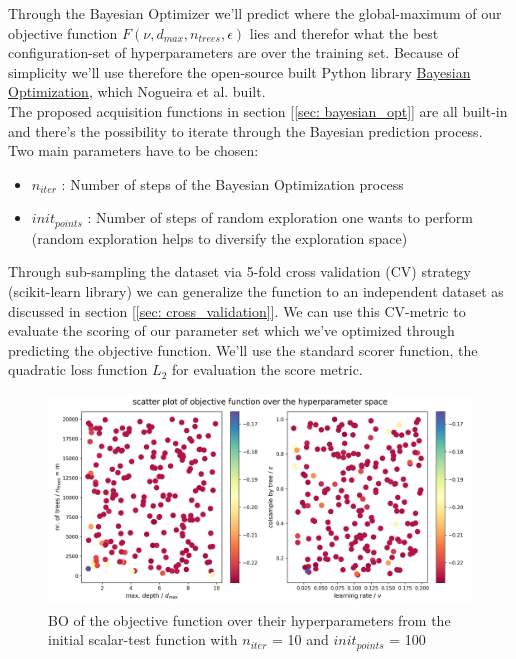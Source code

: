 \documentclass[12pt, a4paper]{article}
\begin{document}
Through the Bayesian Optimizer we'll predict where the global-maximum of our objective function $F(\nu,d_{max},n_{trees},\epsilon)$ lies and therefor what the best configuration-set of hyperparameters are over the training set. Because of simplicity we'll use therefore the open-source built Python library \href{https://github.com/bayesian-optimization/BayesianOptimization}{Bayesian Optimization}, which Nogueira et al. \cite{Nogueira2014} built. \\
The proposed acquisition functions in section [\ref{sec: bayesian_opt}] are all built-in and there's the possibility to iterate through the Bayesian prediction process. Two main parameters have to be chosen:
\begin{itemize}
    \item $n_{iter}$ : Number of steps of the Bayesian Optimization process
    \item $init_{points}$ : Number of steps of random exploration one wants to perform (random exploration helps to diversify the exploration space)
\end{itemize}
Through sub-sampling the dataset via 5-fold cross validation (CV) strategy (scikit-learn library) we can generalize the function to an independent dataset as discussed in section [\ref{sec: cross_validation}]. We can use this CV-metric to evaluate the scoring of our parameter set which we've optimized through predicting the objective function. We'll use the standard scorer function, the quadratic loss function $L_2$ for evaluation the score metric.
\begin{figure}[!htpb]
    \centering
    \includegraphics[width=1\textwidth,trim={0 0 0 0},clip]{figures/gbm_with_decision_tree_hyperparameters_scatter_plot.png}
    \caption[Bayesian Optimizations iterations]{BO of the objective function over their hyperparameters from the initial scalar-test function with $n_{iter}$ = 10 and $init_{points}$ = 100}
    \label{fig: gbm_dt_scatter_plot}    
\end{figure}
\end{document}
